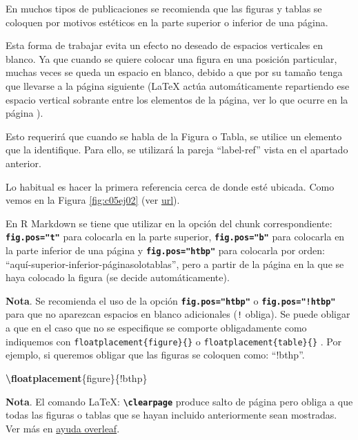 \documentclass[12pt,a4paper,]{book}
\newenvironment{Shaded}{\begin{snugshade}}{\end{snugshade}}
\newcommand{\FunctionTok}[1]{\textcolor[rgb]{0.13,0.29,0.53}{\textbf{#1}}}
\newcommand{\NormalTok}[1]{#1}
\numberwithin{dummy}{section}
\theoremstyle{ocrenumbox}
\theoremstyle{blacknumex}
\theoremstyle{blacknumbox}
\theoremstyle{ocrenum}
\theoremstyle{ocrenum}
\begin{document}
En muchos tipos de publicaciones se recomienda que las figuras y tablas
se coloquen por motivos estéticos en la parte superior o inferior de una
página.

Esta forma de trabajar evita un efecto no deseado de espacios verticales
en blanco. Ya que cuando se quiere colocar una figura en una posición
particular, muchas veces se queda un espacio en blanco, debido a que por
su tamaño tenga que llevarse a la página siguiente (LaTeX actúa
automáticamente repartiendo ese espacio vertical sobrante entre los
elementos de la página, ver lo que ocurre en la página
\pageref{sec:incluirgrafico}).

Esto requerirá que cuando se habla de la Figura o Tabla, se utilice un
elemento que la identifique. Para ello, se utilizará la pareja
``label-ref'' vista en el apartado anterior.

Lo habitual es hacer la primera referencia cerca de donde esté ubicada.
Como vemos en la Figura \ref{fig:c05ej02} (ver
\href{https://resource-cms.springernature.com/springer-cms/rest/v1/content/19112/data/v5}{url}).

En R Markdown se tiene que utilizar en la opción del chunk
correspondiente: \textbf{\texttt{fig.pos="t"}} para colocarla en la
parte superior, \textbf{\texttt{fig.pos="b"}} para colocarla en la parte
inferior de una página y \textbf{\texttt{fig.pos="htbp"}} para colocarla
por orden: ``aquí-superior-inferior-páginasolotablas'', pero a partir de
la página en la que se haya colocado la figura (se decide
automáticamente).

\textbf{Nota}. Se recomienda el uso de la opción
\textbf{\texttt{fig.pos="htbp"}} o \textbf{\texttt{fig.pos="!htbp"}}
para que no aparezcan espacios en blanco adicionales (\texttt{!}
obliga). Se puede obligar a que en el caso que no se especifique se
comporte obligadamente como indiquemos con
\texttt{floatplacement\{figure\}\{\}} o
\texttt{floatplacement\{table\}\{\}} . Por ejemplo, si queremos obligar
que las figuras se coloquen como: ``!bthp''.

\begin{Shaded}
\begin{Highlighting}[]
\FunctionTok{\textbackslash{}floatplacement}\NormalTok{\{figure\}\{!bthp\}}
\end{Highlighting}
\end{Shaded}

\textbf{Nota}. El comando LaTeX:
\textbf{\texttt{\textbackslash{}clearpage}} produce salto de página pero
obliga a que todas las figuras o tablas que se hayan incluido
anteriormente sean mostradas. Ver más en
\href{https://es.overleaf.com/learn/latex/Line_breaks_and_blank_spaces\#Espacios_verticales_en_blanco}{ayuda
overleaf}.
\end{document}
